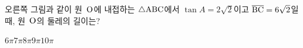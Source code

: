 \noindent\begin{minipage}[t]{0.58\linewidth}\vspace{0pt}\raggedright 오른쪽 그림과 같이 원~$\mathrm{O}$에 내접하는 $\triangle\mathrm{ABC}$에서 $\tan A=2\sqrt{2}$이고 $\overline{\mathrm{BC}}=6\sqrt{2}$일 때, 원~$\mathrm{O}$의 둘레의 길이는?\end{minipage}\hfill\begin{minipage}[t]{0.4\linewidth}\vspace{0pt}\centering \resizebox{\ifdim\width>\linewidth\linewidth\else\width\fi}{!}{}\end{minipage}\par
\begin{choicesii}{$6\pi$}{$7\pi$}{$8\pi$}{$9\pi$}{$10\pi$}\end{choicesii}
